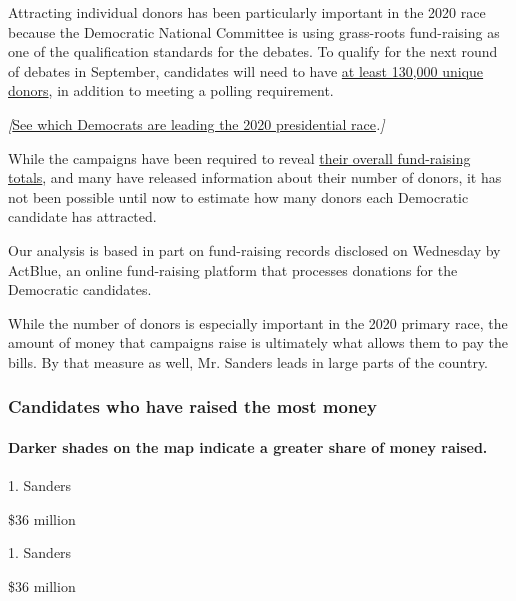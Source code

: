 Attracting individual donors has been particularly important in the 2020
race because the Democratic National Committee is using grass-roots
fund-raising as one of the qualification standards for the debates. To
qualify for the next round of debates in September, candidates will need
to have
\href{https://www.nytimes.com/2019/08/01/us/politics/next-democratic-debate.html}{at
least 130,000 unique donors}, in addition to meeting a polling
requirement.

\emph{{[}}\href{https://www.nytimes.com/interactive/2020/us/elections/democratic-polls.html}{See
which Democrats are leading the 2020 presidential race}\emph{.{]}}

While the campaigns have been required to reveal
\href{https://www.nytimes.com/interactive/2019/07/16/us/politics/democratic-fundraising-2020.html}{their
overall fund-raising totals}, and many have released information about
their number of donors, it has not been possible until now to estimate
how many donors each Democratic candidate has attracted.

Our analysis is based in part on fund-raising records disclosed on
Wednesday by ActBlue, an online fund-raising platform that processes
donations for the Democratic candidates.

While the number of donors is especially important in the 2020 primary
race, the amount of money that campaigns raise is ultimately what allows
them to pay the bills. By that measure as well, Mr. Sanders leads in
large parts of the country.

\hypertarget{candidates-who-have-raised-the-most-money}{%
\subsubsection{Candidates who have raised the most
money}\label{candidates-who-have-raised-the-most-money}}

\hypertarget{darker-shades-on-the-map-indicate-a-greater-share-of-money-raised}{%
\paragraph{Darker shades on the map indicate a greater share of money
raised.}\label{darker-shades-on-the-map-indicate-a-greater-share-of-money-raised}}

1. Sanders

\$36 million

1. Sanders

\$36 million

